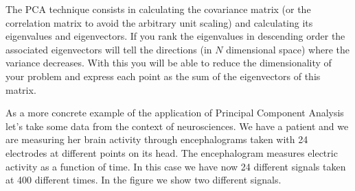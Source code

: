 \documentclass{article}
\begin{document}
The PCA technique consists in calculating the covariance matrix (or
the correlation matrix to avoid the arbitrary unit scaling) and
calculating its eigenvalues and eigenvectors. If you rank the
eigenvalues in descending order the associated eigenvectors will tell
the directions (in $N$ dimensional space) where the variance
decreases. With this you will be able to reduce the dimensionality of
your problem and express each point as the sum of the eigenvectors of
this matrix.

As a more concrete example of the application of Principal Component
Analysis let's take some data from the context of neurosciences. We
have a patient and we are measuring her brain activity through
encephalograms taken with 24 electrodes at different points on its
head. The encephalogram measures electric activity as a function of
time. In this case we have now 24 different signals taken at 400
different times. In the figure we show two different signals.
\end{document}

